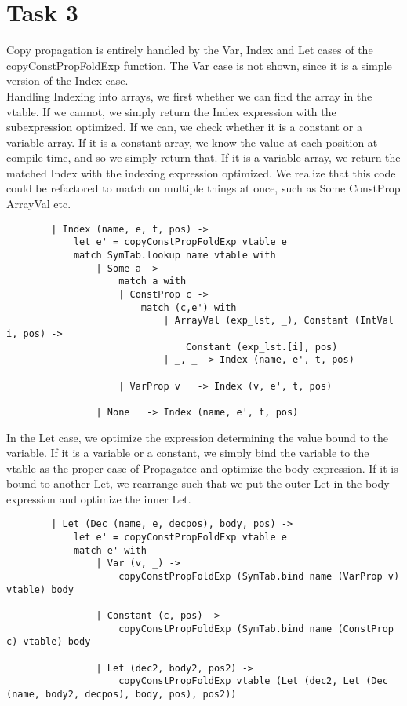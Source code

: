 \pagebreak
\section*{Task 3}

Copy propagation is entirely handled by the Var, Index and Let cases of the copyConstPropFoldExp function. The Var case is not shown, since it is a simple version of the Index case. \\

Handling Indexing into arrays, we first whether we can find the array in the vtable. If we cannot, we simply return the Index expression with the subexpression optimized. If we can, we check whether it is a constant or a variable array. If it is a constant array, we know the value at each position at compile-time, and so we simply return that. If it is a variable array, we return the matched Index with the indexing expression optimized. We realize that this code could be refactored to match on multiple things at once, such as Some ConstProp ArrayVal etc.
\begin{verbatim}
        | Index (name, e, t, pos) ->
            let e' = copyConstPropFoldExp vtable e
            match SymTab.lookup name vtable with
                | Some a ->
                    match a with
                    | ConstProp c -> 
                        match (c,e') with
                            | ArrayVal (exp_lst, _), Constant (IntVal i, pos) -> 
                                Constant (exp_lst.[i], pos)
                            | _, _ -> Index (name, e', t, pos)

                    | VarProp v   -> Index (v, e', t, pos)

                | None   -> Index (name, e', t, pos)
\end{verbatim}


In the Let case, we optimize the expression determining the value bound to the variable. If it is a variable or a constant, we simply bind the variable to the vtable as the proper case of Propagatee and optimize the body expression. If it is bound to another Let, we rearrange such that we put the outer Let in the body expression and optimize the inner Let.
\begin{verbatim}
        | Let (Dec (name, e, decpos), body, pos) ->
            let e' = copyConstPropFoldExp vtable e
            match e' with
                | Var (v, _) ->
                    copyConstPropFoldExp (SymTab.bind name (VarProp v) vtable) body

                | Constant (c, pos) ->
                    copyConstPropFoldExp (SymTab.bind name (ConstProp c) vtable) body

                | Let (dec2, body2, pos2) ->
                    copyConstPropFoldExp vtable (Let (dec2, Let (Dec (name, body2, decpos), body, pos), pos2))
\end{verbatim}

